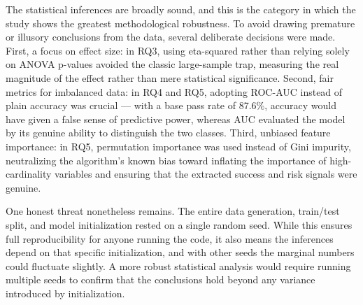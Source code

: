 The statistical inferences are broadly sound, and this is the category in which the study shows the greatest methodological robustness. To avoid drawing premature or illusory conclusions from the data, several deliberate decisions were made. First, a focus on effect size: in RQ3, using eta-squared rather than relying solely on ANOVA p-values avoided the classic large-sample trap, measuring the real magnitude of the effect rather than mere statistical significance. Second, fair metrics for imbalanced data: in RQ4 and RQ5, adopting ROC-AUC instead of plain accuracy was crucial — with a base pass rate of 87.6\%, accuracy would have given a false sense of predictive power, whereas AUC evaluated the model by its genuine ability to distinguish the two classes. Third, unbiased feature importance: in RQ5, permutation importance was used instead of Gini impurity, neutralizing the algorithm's known bias toward inflating the importance of high-cardinality variables and ensuring that the extracted success and risk signals were genuine.

One honest threat nonetheless remains. The entire data generation, train/test split, and model initialization rested on a single random seed. While this ensures full reproducibility for anyone running the code, it also means the inferences depend on that specific initialization, and with other seeds the marginal numbers could fluctuate slightly. A more robust statistical analysis would require running multiple seeds to confirm that the conclusions hold beyond any variance introduced by initialization.
